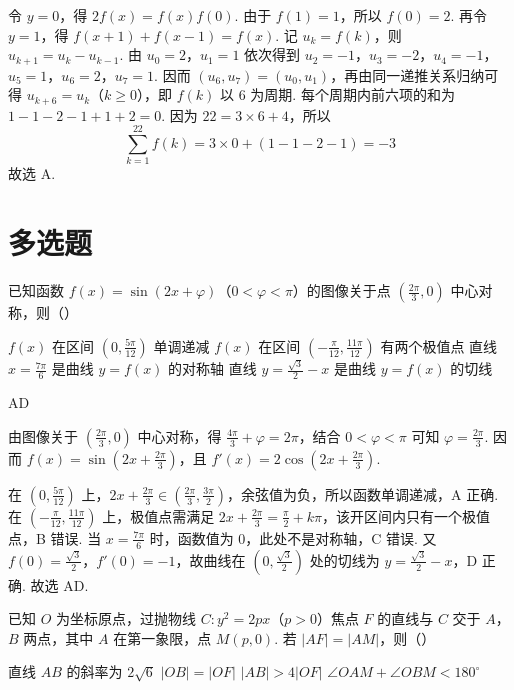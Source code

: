 \begin{solution}
令 \(y=0\)，得 \(2f(x)=f(x)f(0)\). 由于 \(f(1)=1\)，所以 \(f(0)=2\). 再令 \(y=1\)，得
\(f(x+1)+f(x-1)=f(x)\).
记 \(u_k=f(k)\)，则 \(u_{k+1}=u_k-u_{k-1}\). 由 \(u_0=2\)，\(u_1=1\) 依次得到
\(u_2=-1\)，\(u_3=-2\)，\(u_4=-1\)，\(u_5=1\)，\(u_6=2\)，\(u_7=1\). 因而
\((u_6,u_7)=(u_0,u_1)\)，再由同一递推关系归纳可得 \(u_{k+6}=u_k\)（\(k\ge0\)），即 \(f(k)\) 以 \(6\) 为周期. 每个周期内前六项的和为
\(1-1-2-1+1+2=0\). 因为 \(22=3\times6+4\)，所以
\[
\sum_{k=1}^{22}f(k)=3\times0+(1-1-2-1)=-3
\]
故选 A.
\end{solution}

\section{多选题}

\begin{problem}
已知函数 \(f(x)=\sin(2x+\varphi)\)（\(0<\varphi<\pi\)）的图像关于点 \(\left(\frac{2\pi}{3},0\right)\) 中心对称，则（\quad）

\choices
    {\(f(x)\) 在区间 \(\left(0,\frac{5\pi}{12}\right)\) 单调递减}
    {\(f(x)\) 在区间 \(\left(-\frac{\pi}{12},\frac{11\pi}{12}\right)\) 有两个极值点}
    {直线 \(x=\frac{7\pi}{6}\) 是曲线 \(y=f(x)\) 的对称轴}
    {直线 \(y=\frac{\sqrt3}{2}-x\) 是曲线 \(y=f(x)\) 的切线}
\end{problem}

\begin{answer}
AD
\end{answer}

\begin{solution}
由图像关于 \(\left(\frac{2\pi}{3},0\right)\) 中心对称，得
\(\frac{4\pi}{3}+\varphi=2\pi\)，结合 \(0<\varphi<\pi\) 可知 \(\varphi=\frac{2\pi}{3}\). 因而
\(f(x)=\sin\left(2x+\frac{2\pi}{3}\right)\)，且
\(f'(x)=2\cos\left(2x+\frac{2\pi}{3}\right)\).

在 \(\left(0,\frac{5\pi}{12}\right)\) 上，\(2x+\frac{2\pi}{3}\in\left(\frac{2\pi}{3},\frac{3\pi}{2}\right)\)，余弦值为负，所以函数单调递减，A 正确. 在 \(\left(-\frac\pi{12},\frac{11\pi}{12}\right)\) 上，极值点需满足 \(2x+\frac{2\pi}{3}=\frac\pi2+k\pi\)，该开区间内只有一个极值点，B 错误. 当 \(x=\frac{7\pi}{6}\) 时，函数值为 \(0\)，此处不是对称轴，C 错误. 又 \(f(0)=\frac{\sqrt3}{2}\)，\(f'(0)=-1\)，故曲线在 \(\left(0,\frac{\sqrt3}{2}\right)\) 处的切线为 \(y=\frac{\sqrt3}{2}-x\)，D 正确.
故选 AD.
\end{solution}


\begin{problem}
已知 \(O\) 为坐标原点，过抛物线 \(C:y^2=2px\)（\(p>0\)）焦点 \(F\) 的直线与 \(C\) 交于 \(A\)，\(B\) 两点，其中 \(A\) 在第一象限，点 \(M(p,0)\). 若 \(|AF|=|AM|\)，则（\quad）

\choices
    {直线 \(AB\) 的斜率为 \(2\sqrt6\)}
    {\(|OB|=|OF|\)}
    {\(|AB|>4|OF|\)}
    {\(\angle OAM+\angle OBM<180^\circ\)}
\end{problem}

